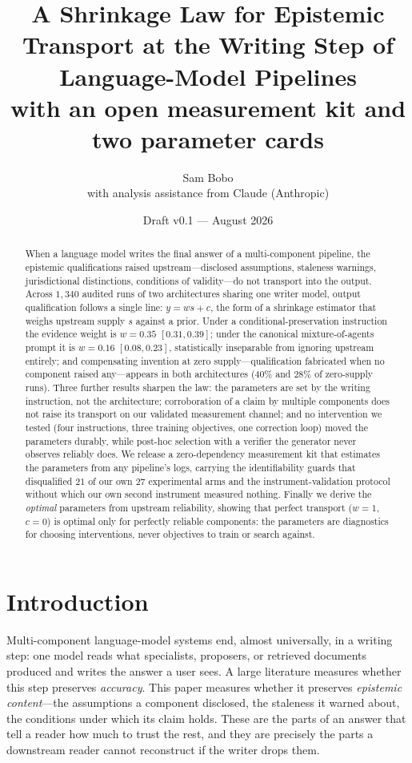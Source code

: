 \documentclass[11pt]{article}
\title{A Shrinkage Law for Epistemic Transport at the Writing Step of
Language-Model Pipelines\\[4pt]
\large with an open measurement kit and two parameter cards}
\author{Sam Bobo\\ \small with analysis assistance from Claude (Anthropic)}
\date{Draft v0.1 --- August 2026}
\newcommand{\ww}{\ensuremath{w}}
\newcommand{\cc}{\ensuremath{c}}
\begin{document}
\maketitle

\begin{abstract}
When a language model writes the final answer of a multi-component pipeline,
the epistemic qualifications raised upstream---disclosed assumptions, staleness
warnings, jurisdictional distinctions, conditions of validity---do not
transport into the output. Across $1{,}340$ audited runs of two architectures
sharing one writer model, output qualification follows a single line:
$y = \ww s + \cc$, the form of a shrinkage estimator that weighs upstream
supply $s$ against a prior. Under a conditional-preservation instruction the
evidence weight is $\ww=0.35$ $[0.31,0.39]$; under the canonical
mixture-of-agents prompt it is $\ww=0.16$ $[0.08,0.23]$, statistically
inseparable from ignoring upstream entirely; and compensating invention at
zero supply---qualification fabricated when no component raised any---appears
in both architectures ($40\%$ and $28\%$ of zero-supply runs). Three further
results sharpen the law: the parameters are set by the writing instruction,
not the architecture; corroboration of a claim by multiple components does not
raise its transport on our validated measurement channel; and no intervention
we tested (four instructions, three training objectives, one correction loop)
moved the parameters durably, while post-hoc selection with a verifier the
generator never observes reliably does. We release a zero-dependency
measurement kit that estimates the parameters from any pipeline's logs,
carrying the identifiability guards that disqualified $21$ of our own $27$
experimental arms and the instrument-validation protocol without which our own
second instrument measured nothing. Finally we derive the \emph{optimal}
parameters from upstream reliability, showing that perfect transport
($\ww{=}1$, $\cc{=}0$) is optimal only for perfectly reliable components: the
parameters are diagnostics for choosing interventions, never objectives to
train or search against.
\end{abstract}

\section{Introduction}
\label{sec:intro}

Multi-component language-model systems end, almost universally, in a writing
step: one model reads what specialists, proposers, or retrieved documents
produced and writes the answer a user sees. A large literature measures
whether this step preserves \emph{accuracy}. This paper measures whether it
preserves \emph{epistemic content}---the assumptions a component disclosed,
the staleness it warned about, the conditions under which its claim holds.
These are the parts of an answer that tell a reader how much to trust the
rest, and they are precisely the parts a downstream reader cannot
reconstruct if the writer drops them.
\end{document}

